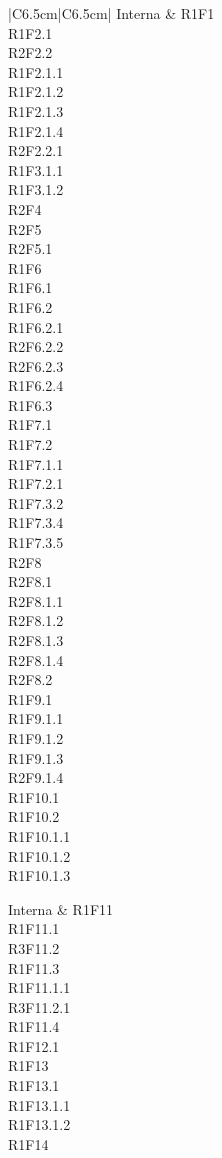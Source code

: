 \begin{longtable}{|C{6.5cm}|C{6.5cm}|}
	Interna &
	\centering
	R1F1\\
	R1F2.1 \\
	R2F2.2\\
	R1F2.1.1\\
	R1F2.1.2\\
	R1F2.1.3\\
	R1F2.1.4\\
	R2F2.2.1\\
	R1F3.1.1\\
	R1F3.1.2\\
	R2F4\\
	R2F5\\
	R2F5.1\\
	R1F6\\
	R1F6.1\\
	R1F6.2\\
	R1F6.2.1\\
	R2F6.2.2\\
	R2F6.2.3\\
	R1F6.2.4\\
	R1F6.3\\
	R1F7.1\\
	R1F7.2\\
	R1F7.1.1\\
	R1F7.2.1\\
	R1F7.3.2\\
	R1F7.3.4\\
	R1F7.3.5\\
	R2F8\\
	R2F8.1\\
	R2F8.1.1\\
	R2F8.1.2\\
	R2F8.1.3\\
	R2F8.1.4\\
	R2F8.2\\
	R1F9.1\\
	R1F9.1.1\\
	R1F9.1.2\\
	R1F9.1.3\\
	R2F9.1.4\\
	R1F10.1\\
	R1F10.2\\
	R1F10.1.1\\
	R1F10.1.2\\
	R1F10.1.3\\

	\tabularnewline

	Interna &
	\centering
	R1F11\\
	R1F11.1\\
	R3F11.2\\
	R1F11.3\\
	R1F11.1.1\\
	R3F11.2.1\\
	R1F11.4\\
	R1F12.1\\
	R1F13\\
	R1F13.1\\
	R1F13.1.1\\
	R1F13.1.2\\
	R1F14\\


\end{longtable}
